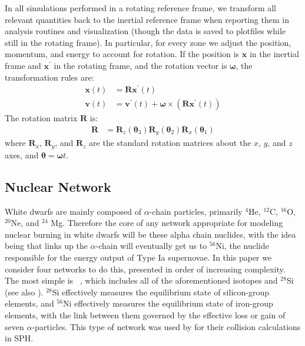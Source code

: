 \documentclass[12pt]{article}
\begin{document}
In all simulations performed in a rotating reference frame, we transform all relevant
quantities back to the inertial reference frame when reporting them in analysis routines 
and visualization (though the data is saved to plotfiles while still in the rotating frame). In particular,
for every zone we adjust the position, momentum, and energy to account for rotation.
If the position is $\mathbf{x}$ in the inertial frame and $\mathbf{x}^\prime$ in 
the rotating frame, and the rotation vector is $\bm{\omega}$, the transformation rules are:
\begin{align}  
  \mathbf{x}(t) &= \mathbf{R}\mathbf{x}^\prime(t) \\
  \mathbf{v}(t) &= \mathbf{v}^\prime(t) + \bm{\omega} \times \left(\mathbf{R} \mathbf{x}^\prime(t)\right)
\end{align}
The rotation matrix $\mathbf{R}$ is:
\begin{align}
  \mathbf{R} &= \mathbf{R}_z({\bm{\theta}}_3) \mathbf{R}_y({\bm{\theta}}_2) \mathbf{R}_x({\bm{\theta}}_1)
\end{align}
where $\mathbf{R}_x$, $\mathbf{R}_y$, and $\mathbf{R}_z$ are the standard rotation matrices about 
the $x$, $y$, and $z$ axes, and $\bm{\theta} = \bm{\omega} t$.



\subsection{Nuclear Network}
\label{sec:network}

White dwarfs are mainly composed of $\alpha$-chain particles, primarily ${}^4$He,
${}^{12}$C, ${}^{16}$O, ${}^{20}$Ne, and ${}^{24}$ Mg. Therefore the core of
any network appropriate for modeling nuclear burning in white dwarfs will be
these alpha chain nuclides, with the idea being that links up the $\alpha$-chain
will eventually get us to ${}^{56}$Ni, the nuclide responsible for the
energy output of Type Ia supernovae. In this paper we consider four networks
to do this, presented in order of increasing complexity. The most simple is
\isoseven\ \citep{timmes:2000}, which includes all of the aforementioned isotopes and
${}^{28}$Si (see also \citet{hix:1998}). ${}^{28}$Si effectively measures the
equilibrium state of silicon-group elements, and ${}^{56}$Ni effectively measures
the equilibrium state of iron-group elements, with the link between them governed
by the effective loss or gain of seven $\alpha$-particles. This type of network
was used by \citet{rosswog:2009} for their collision calculations in SPH.
\end{document}
